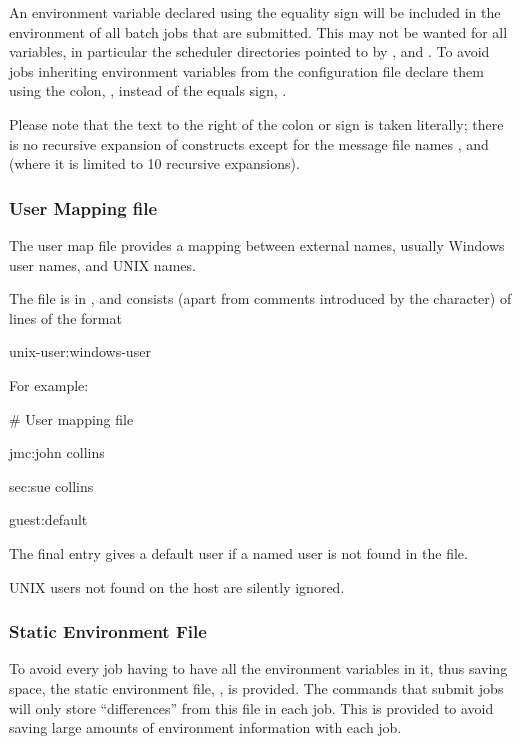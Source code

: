 An environment variable declared using the equality sign \exampletext{=} will be included in the environment of all
batch jobs that are submitted. This may not be wanted for all variables, in particular the scheduler directories pointed to by
,  and . To avoid jobs inheriting environment
variables from the configuration file declare them using the colon, \exampletext{:} , instead of the equals sign,
\exampletext{=}.

Please note that the text to the right of the colon or \exampletext{=} sign is taken literally; there is no recursive
expansion of  constructs except for the message file names ,
 and  (where it is limited to 10 recursive expansions).

\subsubsection{User Mapping file}
The user map file provides a mapping between external names, usually Windows user names, and UNIX names.

The file is in \usermap, and consists (apart from comments introduced by the \filename{\#} character) of
lines of the format

\begin{expara}

unix-user:windows-user

\end{expara}

For example:

\begin{expara}

\# User mapping file

jmc:john collins

sec:sue collins

guest:default

\end{expara}

The final entry gives a default user if a named user is not found in the file.

UNIX users not found on the host are silently ignored.

\subsubsection{\manualProduct{} Static Environment File}
\label{SEfiles}To avoid every job having to have all the environment variables in it, thus saving space, the static environment file,
\batchenv{}, is provided. The commands that submit jobs will only store ``differences'' from this file in each job.
This is provided to avoid saving large amounts of environment information with each job.

